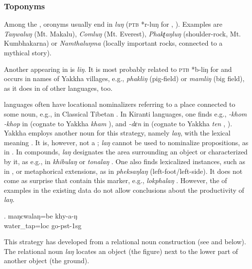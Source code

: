  
\subsubsection{Toponyms}
 
Among the , oronyms usually end in \emph{luŋ} (\textsc{ptb} *r-luŋ for , \citealt[50]{Matisoff2003Handbook}). Examples are \emph{Taŋwaluŋ} (Mt. Makalu), \emph{Comluŋ} (Mt. Everest), \emph{Phakʈaŋluŋ}  (shoulder-rock, Mt. Kumbhakarna) or \emph{Namthaluŋma} (locally important rocks, connected to a mythical story).

Another  appearing in  is \emph{liŋ}. It  is most probably related to \textsc{ptb} *b-liŋ for   \citep[280]{Matisoff2003Handbook} and occurs in names of Yakkha villages, e.g., \emph{phakliŋ} (pig-field) or \emph{mamliŋ}  (big field), as it does in  of other  languages, too.

 languages often have locational nominalizers referring to a place connected to some noun, e.g., in Classical Tibetan \citep[300]{Beyer1992_Tibetan}. In Kiranti languages, one finds e.g., \emph{-khom \ti -khop} in  (cognate to Yakkha \emph{kham} ), and \emph{-dɛn} in  (cognate to Yakkha \emph{ten} , \citealt[89]{Ebert1994The-structure}). Yakkha  employs another noun for this strategy, namely \emph{laŋ}, with the lexical meaning . It is, however, not a ;  \emph{laŋ} cannot be used to nominalize propositions, as in . In compounds, \emph{laŋ} designates the area surrounding an object or characterized by it, as e.g., in \emph{khibulaŋ}  or \emph{tonalaŋ} . One also finds lexicalized instances, such as in \Next, or metaphorical extensions, as in \emph{pheksaŋlaŋ}  (left-foot/left-side). It does not come as surprise that  contain this marker, e.g., \emph{lokphalaŋ} . However, the  of examples in the existing data do not allow conclusions about the productivity of \emph{laŋ}. 

\exg. maŋcwalaŋ=be khy-a-ŋ\\
water\_tap{\sc =loc} go{\sc -pst-1sg}\\
  

This  strategy has developed from a relational noun construction (see \Next and  below). The relational noun \emph{laŋ} locates an object (the {\sc figure}) next to the lower part of another object (the {\sc ground}). 


